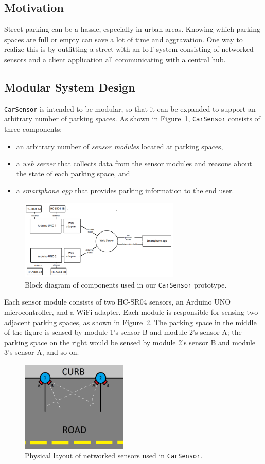 \documentclass[conference]{IEEEtran}
\begin{document}
\subsection{Motivation}
Street parking can be a hassle, especially in urban areas. Knowing which parking spaces are full or empty can save a lot of time and aggravation. One way to realize this is by outfitting a street with an IoT system consisting of networked sensors and a client application all communicating with a central hub.

\subsection{Modular System Design}
\texttt{CarSensor} is intended to be modular, so that it can be expanded to support an arbitrary number of parking spaces. As shown in Figure~\ref{fig_blockdiagram}, \texttt{CarSensor} consists of three components:
\begin{itemize}
\item an arbitrary number of \textit{sensor modules} located at parking spaces,
\item a \textit{web server} that collects data from the sensor modules and reasons about the state of each parking space, and
\item a \textit{smartphone app} that provides parking information to the end user.
\end{itemize}

\begin{figure}[h]
\centering
\includegraphics[width=3.0in]{block_diagram_0.png}
\caption{Block diagram of components used in our \texttt{CarSensor} prototype.}
\label{fig_blockdiagram}
\end{figure}

Each sensor module consists of two HC-SR04 sensors, an Arduino UNO microcontroller, and a WiFi adapter. Each module is responsible for sensing two adjacent parking spaces, as shown in Figure~\ref{fig_curb}. The parking space in the middle of the figure is sensed by module 1's sensor B and module 2's sensor A; the parking space on the right would be sensed by module 2's sensor B and module 3's sensor A, and so on.
\begin{figure}[h]
\centering
\includegraphics[width=2.0in]{parkingspace.png}
\caption{Physical layout of networked sensors used in \texttt{CarSensor}.}
\label{fig_curb}
\end{figure}
\end{document}
